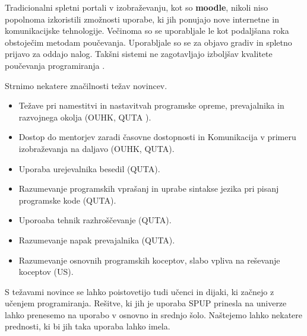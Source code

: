 


Tradicionalni spletni portali v izobraževanju, kot so \textbf{moodle},
nikoli niso popolnoma izkoristili zmožnosti uporabe, ki jih ponujajo
nove internetne in komunikacijske tehnologije. Večinoma so se
uporabljale le kot podaljšana roka obstoječim metodam
poučevanja. Uporabljale so se za objavo gradiv in spletno prijavo za
oddajo nalog. Takšni sistemi ne zagotavljajo izboljšav kvalitete
poučevanja programiranja \cite{ITaLCP_DistanceEdu}.

Strnimo nekatere značilnosti težav novincev.

\begin{itemize}
\tightlist
\item Težave pri namestitvi in nastavitvah programske opreme,
  prevajalnika in razvojnega okolja (OUHK, QUTA ).
\item Dostop do mentorjev zaradi časovne dostopnosti in Komunikacija v
  primeru izobraževanja na daljavo (OUHK, QUTA).
\item Uporaba urejevalnika besedil (QUTA).
\item Razumevanje programskih vprašanj in uprabe sintakse jezika pri
  pisanj programske kode (QUTA).
\item Uporoaba tehnik razhroščevanje (QUTA).
\item Razumevanje napak prevajalnika (QUTA).
\item Razumevanje osnovnih programskih koceptov, slabo vpliva na
  reševanje koceptov (US).
\end{itemize}

S težavami novince se lahko poistovetijo tudi učenci in dijaki, ki začnejo z
učenjem programiranja. Rešitve, ki jih je uporaba SPUP prinesla na
univerze lahko prenesemo na uporabo v osnovno in srednjo
šolo. Naštejemo lahko nekatere prednosti, ki bi jih taka uporaba lahko
imela.

